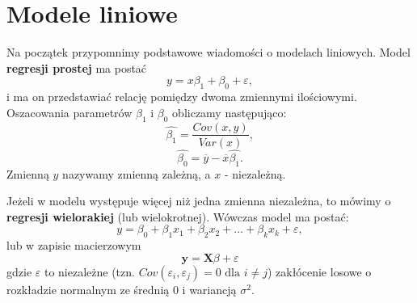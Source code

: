 \documentclass[12pt]{mwbk}
\theoremstyle{plain}
\theoremstyle{definition}
\theoremstyle{definition}
\newcommand{\yy}{\mathbf{y}}
\begin{document}
\section{Modele liniowe}
Na początek przypomnimy podstawowe wiadomości o modelach liniowych. Model \textbf{regresji prostej} ma postać $$y=x \beta_1+\beta_0 + \varepsilon,$$ i ma on przedstawiać relację pomiędzy dwoma zmiennymi ilościowymi. Oszacowania parametrów $\beta_1$ i $\beta_0$ obliczamy następująco:
$$\hat{\beta_1}=\frac{Cov(x,y)}{Var(x)},$$
$$\hat{\beta_0}=\overline{y}-\overline{x}\hat{\beta_1}.$$ Zmienną $y$ nazywamy zmienną zależną, a $x$ - niezależną.

Jeżeli w modelu występuje więcej niż jedna zmienna niezależna, to mówimy o \textbf{regresji wielorakiej} (lub wielokrotnej). Wówczas model ma postać: $$y=\beta_0+\beta_1 x_1+\beta_2 x_2 + \ldots + \beta_k x_k + \varepsilon,$$ lub w zapisie macierzowym $$\yy=\mathbf{X}\beta+\varepsilon$$
gdzie $\varepsilon$ to niezależne (tzn. $Cov(\varepsilon_i, \varepsilon_j)=0 \text{ dla }i\neq j$) zakłócenie losowe o rozkładzie normalnym ze średnią 0 i wariancją $\sigma^2$.
\end{document}
